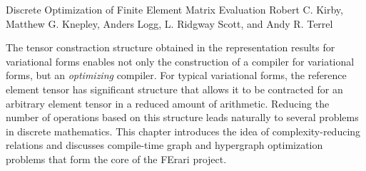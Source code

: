               {Discrete Optimization of Finite Element Matrix Evaluation}
              {Robert C. Kirby, Matthew G. Knepley, Anders Logg, L. Ridgway Scott, and Andy R. Terrel}

\editornote{[kirby-4]}

The tensor constraction structure obtained in the representation
results for variational forms enables not only the construction of a
compiler for variational forms, but an \emph{optimizing} compiler.
For typical variational forms, the reference element tensor has
significant structure that allows it to be contracted for an arbitrary
element tensor in a reduced amount of arithmetic.  Reducing the number
of operations based on this structure leads naturally to several
problems in discrete mathematics.  This chapter introduces the idea of
complexity-reducing relations and discusses compile-time graph and
hypergraph optimization problems that form the core of the FErari
project.
